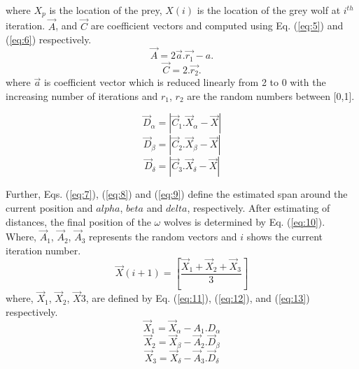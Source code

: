 \documentclass[review]{elsarticle}
\begin{document}
     where $X_p$ is the location of the prey, $X(i)$ is the location of the grey wolf at $i^{th}$ iteration. $\overrightarrow A$, and $\overrightarrow C$ are coefficient vectors and computed using Eq. (\ref{eq:5}) and (\ref{eq:6}) respectively. 
 \begin{equation}\label{eq:5}                                             	
       \overrightarrow A=2 \overrightarrow a. \overrightarrow {r_1}-a.                                                     	
   \end{equation}
   \begin{equation}\label{eq:6} 
   \overrightarrow C=2. \overrightarrow {r_2}.
    \end{equation} 
  	 where $\overrightarrow a$ is coefficient vector which is reduced linearly from 2 to 0 with the increasing number of iterations and $r_1$, $r_2$ are the random numbers between [0,1]. 

     \begin{equation}\label{eq:7}
    \overrightarrow D_{\alpha}=|\overrightarrow C_1.\overrightarrow X_{\alpha}-\overrightarrow X|                           
\end{equation} 
 \begin{equation}\label{eq:8}
    \overrightarrow D_{\beta}=|\overrightarrow C_2.\overrightarrow X_{\beta}-\overrightarrow X|                          
\end{equation} 
 \begin{equation}\label{eq:9}
       \overrightarrow D_{\delta}=|\overrightarrow C_3.\overrightarrow X_{\delta}-\overrightarrow X|                          
\end{equation} 

 Further, Eqs. (\ref{eq:7}), (\ref{eq:8}) and (\ref{eq:9}) define the estimated span around the current position and $alpha$, $beta$ and $delta$, respectively.
After estimating of distances, the final position of the $\omega$ wolves is determined by Eq. (\ref{eq:10}). Where, $\overrightarrow A_1$, $\overrightarrow A_2$, $\overrightarrow A_3$ represents the random vectors and $i$ shows the current iteration number. 
\begin{equation}\label{eq:10}
        \overrightarrow X(i+1)=\left[ \frac{\overrightarrow X_1+\overrightarrow X_2+\overrightarrow X_3} {3}\right]     
\end{equation} 
where, $\overrightarrow X_1$, $\overrightarrow X_2$, $\overrightarrow X3$, are defined by Eq. (\ref{eq:11}), (\ref{eq:12}), and (\ref{eq:13}) respectively.
 \begin{equation}\label{eq:11}
    \overrightarrow X_1=\overrightarrow X_{\alpha}-A_1.D_{\alpha}      \end{equation}                     
 \begin{equation}\label{eq:12}
    \overrightarrow X_2=\overrightarrow X_{\beta}-\overrightarrow A_2.\overrightarrow D_{\beta}      \end{equation}                     
 \begin{equation}\label{eq:13}
       \overrightarrow X_3=\overrightarrow X_{\delta}-\overrightarrow A_3.\overrightarrow D_{\delta}        \end{equation}              
\end{document}
